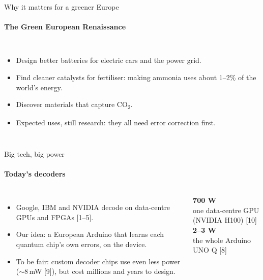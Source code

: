 \documentclass[aspectratio=169,11pt]{beamer}
\newcommand{\eur}{\texteuro}
\newcommand{\hl}[1]{{\color{accent}#1}}
\newcommand{\good}[1]{{\color{green}#1}}
\newcommand{\dimnote}[1]{{\color{dim}\small #1}}
\newcommand{\bignum}[2]{{\color{#1}\fontsize{40}{44}\selectfont\bfseries #2}}
\begin{document}
\begin{frame}{Why it matters for a greener Europe}\framesubtitle{The Green European Renaissance}
  \begin{columns}[c]
    \begin{itemize}\setlength\itemsep{0.6em}
      \item Design better \good{batteries} for electric cars and the power grid.
      \item Find cleaner \good{catalysts for fertiliser}: making ammonia uses about 1--2\% of the world's energy.
      \item Discover materials that \good{capture CO\textsubscript{2}}.
      \item \dimnote{Expected uses, still research: they all need error correction first.}
    \end{itemize}
    \centering
  \end{columns}
\end{frame}

\begin{frame}{Big tech, big power}\framesubtitle{Today's decoders}
  \begin{columns}[c]
    \begin{itemize}\setlength\itemsep{0.7em}
      \item Google, IBM and NVIDIA decode on data-centre GPUs and FPGAs [1--5].
      \item \hl{Our idea:} a \eur60 European Arduino that learns each quantum chip's own errors, \hl{on the device}.
      \item \dimnote{To be fair: custom decoder chips use even less power ($\sim$8\,mW [9]), but cost millions and years to design.}
    \end{itemize}
    \centering
    \bignum{red}{700 W}\\ \dimnote{one data-centre GPU (NVIDIA H100) [10]}\\[1.2em]
    \bignum{green}{2--3 W}\\ \dimnote{the whole Arduino UNO Q [8]}
  \end{columns}
\end{frame}
\end{document}
